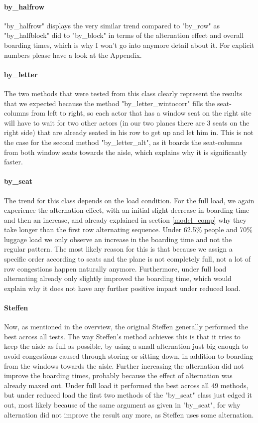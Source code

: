 \documentclass[11pt]{article}
\begin{document}
 \paragraph{by\_halfrow}
 "by\_halfrow" displays the very similar trend compared to "by\_row" as "by\_halfblock" did to "by\_block" in terms of the alternation effect and overall boarding times, which is why I won't go into anymore detail about it. For explicit numbers please have a look at the Appendix. 
 
 \paragraph{by\_letter}
 The two methods that were tested from this class clearly represent the results that we expected because the method "by\_letter\_wintocorr" fills the seat-columns from left to right, so each actor that has a window seat on the right site will have to wait for two other actors (in our two planes there are 3 seats on the right side) that are already seated in his row to get up and let him in. This is not the case for the second method "by\_letter\_alt", as it boards the seat-columns from both window seats towards the aisle, which explains why it is significantly faster.
 
 \paragraph{by\_seat}
 The trend for this class depends on the load condition. For the full load, we again experience the alternation effect, with an initial slight decrease in boarding time and then an increase, and already explained in section \ref{model_comp} why they take longer than the first row alternating sequence. Under 62.5\% people and 70\% luggage load we only observe an increase in the boarding time and not the regular pattern. The most likely reason for this is that because we assign a specific order according to seats and the plane is not completely full, not a lot of row congestions happen naturally anymore. Furthermore, under full load alternating already only slightly improved the boarding time, which would explain why it does not have any further positive impact under reduced load. 
 
 \paragraph{Steffen}
 Now, as mentioned in the overview, the original Steffen generally performed the best across all tests. The way Steffen's method achieves this is that it tries to keep the aisle as full as possible, by using a small alternation just big enough to avoid congestions caused through storing or sitting down, in addition to boarding from the windows towards the aisle. Further increasing the alternation did not improve the boarding times, probably because the effect of alternation was already maxed out. Under full load it performed the best across all 49 methods, but under reduced load the first two methods of the "by\_seat" class just edged it out, most likely because of the same argument as given in "by\_seat", for why alternation did not improve the result any more, as Steffen uses some alternation. 
 
\end{document}
